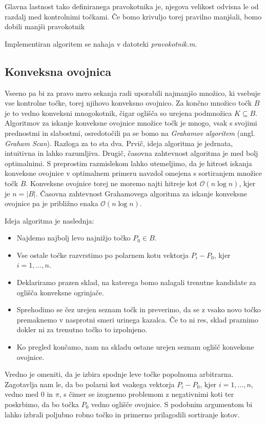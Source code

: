 \documentclass[a4paper, 12pt]{article} %
\begin{document}
Glavna lastnost tako definiranega pravokotnika je, njegova velikost odvisna le od razdalj med kontrolnimi točkami. Če bomo krivuljo torej pravilno manjšali, bomo dobili manjši pravokotnik

Implementiran algoritem se nahaja v datoteki \emph{pravokotnik.m}.

\subsection{Konveksna ovojnica}
Vseeno pa bi za pravo mero sekanja radi uporabili najmanjšo množico, ki vsebuje vse kontrolne točke, torej njihovo konveksno ovojnico. Za končno množico točk $B$ je to vedno konveksni mnogokotnik, čigar oglišča so urejena podmnožica $K \subseteq B$. Algoritmov za iskanje konveksne ovojnice množice točk je mnogo, vsak s svojimi prednostmi in slabostmi, osredotočili pa se bomo na \emph{Grahamov algoritem} (angl. \emph{Graham Scan}). Razloga za to sta dva. Prvič, ideja algoritma je jedrnata, intuitivna in lahko razumljiva. Drugič, časovna zahtevnost algoritma je med bolj optimalnimi. S preprostim razmislekom lahko utemeljimo, da je hitrost iskanja konveksne ovojnice v optimalnem primeru navzdol omejena s sortiranjem množice točk $B$. Konveksne ovojnice torej ne moremo najti hitreje kot $\mathcal{O}(n\log{}n)$, kjer je $n = |B|$. Časovna zahtevnost Grahamovega algoritma za iskanje konveksne ovojnice pa je približno enaka $\mathcal{O}(n\log{}n)$.

Ideja algoritma je naslednja:
\begin{itemize}
\item Najdemo najbolj levo najnižjo točko $P_0 \in B$.
\item Vse ostale točke razvrstimo po polarnem kotu vektorja $P_i - P_0$, kjer $i = 1, \dots, n$.
\item Deklariramo prazen sklad, na katerega bomo nalagali trenutne kandidate za oglišča konveksne ogrinjače.
\item Sprehodimo se čez urejen seznam točk in preverimo, da se z vsako novo točko premaknemo v nasprotni smeri urinega kazalca. Če to ni res, sklad praznimo dokler ni za trenutno točko to izpolnjeno.
\item Ko pregled končamo, nam na skladu ostane urejen seznam oglišč konveksne ovojnice.
\end{itemize}

Vredno je omeniti, da je izbira spodnje leve točke popolnoma arbitrarna. Zagotavlja nam le, da bo polarni kot vsakega vektorja $P_i - P_0$, kjer $i = 1, \dots, n$, vedno med $0$ in $\pi$, s čimer se izognemo problemom z negativnimi koti ter poskrbimo, da bo točka $P_0$ vedno oglišče ovojnice. S podobnim argumentom bi lahko izbrali poljubno robno točko in primerno prilagodili sortiranje kotov.
\end{document}
